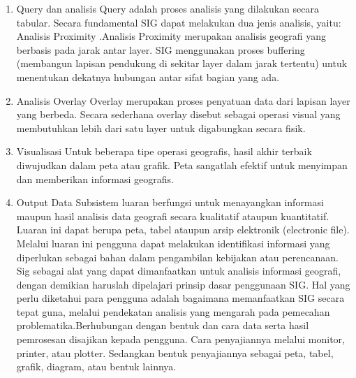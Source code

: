 \begin{enumerate}
\item Query dan analisis
\subitem Query adalah proses analisis yang dilakukan secara tabular. Secara fundamental SIG dapat melakukan dua jenis analisis, yaitu:  Analisis Proximity .Analisis Proximity merupakan analisis geografi yang berbasis pada jarak antar layer. SIG menggunakan proses buffering (membangun lapisan pendukung di sekitar layer dalam jarak tertentu) untuk menentukan dekatnya hubungan antar sifat bagian yang ada.

\item Analisis Overlay
\subitem Overlay merupakan proses penyatuan data dari lapisan layer yang berbeda. Secara sederhana overlay disebut sebagai operasi visual yang membutuhkan lebih dari satu layer untuk digabungkan secara fisik.

\item Visualisasi
\subitem Untuk beberapa tipe operasi geografis, hasil akhir terbaik diwujudkan dalam peta atau grafik. Peta sangatlah efektif untuk menyimpan dan memberikan informasi geografis.

\item Output Data 
\subitem Subsistem luaran berfungsi untuk menayangkan informasi maupun hasil analisis data geografi secara kualitatif ataupun kuantitatif. Luaran ini dapat berupa peta, tabel ataupun arsip elektronik (electronic file). Melalui luaran ini pengguna dapat melakukan identifikasi informasi yang diperlukan sebagai bahan dalam pengambilan kebijakan atau perencanaan.
Sig sebagai alat yang dapat dimanfaatkan untuk analisis informasi geografi, dengan demikian haruslah dipelajari prinsip dasar penggunaan SIG. Hal yang perlu diketahui para pengguna adalah bagaimana memanfaatkan SIG secara tepat guna, melalui pendekatan analisis yang mengarah pada pemecahan problematika.Berhubungan dengan bentuk dan cara data serta hasil pemrosesan disajikan kepada pengguna. Cara penyajiannya melalui monitor, printer, atau plotter. Sedangkan bentuk penyajiannya sebagai peta, tabel, grafik, diagram, atau bentuk lainnya.
\end{enumerate}


